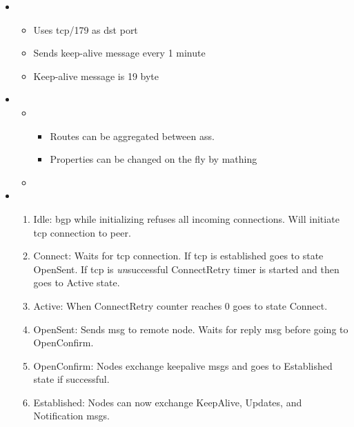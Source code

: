 \begin{itemize}
    \item {}
    \begin{itemize}
        \item Uses tcp/179 as \gls{dst} port
        \item Sends keep-alive message every 1 minute
        \item Keep-alive message is 19 byte
    \end{itemize}
    \item {}
    \begin{itemize}
        \item {}
        \begin{itemize}
            \item Routes can be aggregated between \Glspl{as}.
            \item Properties can be changed on the fly by mathing
        \end{itemize}
        \item 
    \end{itemize}
    \item {}
    \begin{enumerate}
        \item Idle: \Gls{bgp} while initializing refuses all incoming connections. Will initiate \Gls{tcp} connection to peer.
        \item Connect: Waits for \Gls{tcp} connection. If \Gls{tcp} is established goes to state OpenSent. If \Gls{tcp} is \textit{un}successful ConnectRetry timer is started and then goes to Active state.
        \item Active: When ConnectRetry counter reaches 0 goes to state Connect.
        \item OpenSent: Sends \gls{msg} to remote node. Waits for reply \gls{msg} before going to OpenConfirm.
        \item OpenConfirm: Nodes exchange keepalive \glspl{msg} and goes to Established state if successful.
        \item Established: Nodes can now exchange KeepAlive, Updates, and Notification \glspl{msg}.
    \end{enumerate}
\end{itemize}
